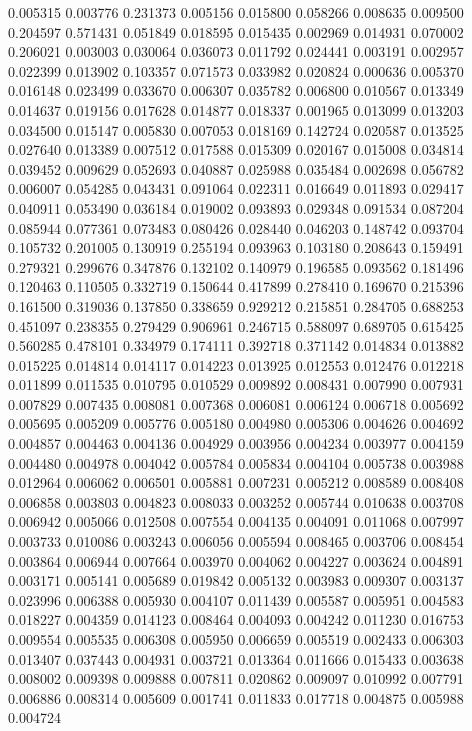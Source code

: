 0.005315
0.003776
0.231373
0.005156
0.015800
0.058266
0.008635
0.009500
0.204597
0.571431
0.051849
0.018595
0.015435
0.002969
0.014931
0.070002
0.206021
0.003003
0.030064
0.036073
0.011792
0.024441
0.003191
0.002957
0.022399
0.013902
0.103357
0.071573
0.033982
0.020824
0.000636
0.005370
0.016148
0.023499
0.033670
0.006307
0.035782
0.006800
0.010567
0.013349
0.014637
0.019156
0.017628
0.014877
0.018337
0.001965
0.013099
0.013203
0.034500
0.015147
0.005830
0.007053
0.018169
0.142724
0.020587
0.013525
0.027640
0.013389
0.007512
0.017588
0.015309
0.020167
0.015008
0.034814
0.039452
0.009629
0.052693
0.040887
0.025988
0.035484
0.002698
0.056782
0.006007
0.054285
0.043431
0.091064
0.022311
0.016649
0.011893
0.029417
0.040911
0.053490
0.036184
0.019002
0.093893
0.029348
0.091534
0.087204
0.085944
0.077361
0.073483
0.080426
0.028440
0.046203
0.148742
0.093704
0.105732
0.201005
0.130919
0.255194
0.093963
0.103180
0.208643
0.159491
0.279321
0.299676
0.347876
0.132102
0.140979
0.196585
0.093562
0.181496
0.120463
0.110505
0.332719
0.150644
0.417899
0.278410
0.169670
0.215396
0.161500
0.319036
0.137850
0.338659
0.929212
0.215851
0.284705
0.688253
0.451097
0.238355
0.279429
0.906961
0.246715
0.588097
0.689705
0.615425
0.560285
0.478101
0.334979
0.174111
0.392718
0.371142
0.014834
0.013882
0.015225
0.014814
0.014117
0.014223
0.013925
0.012553
0.012476
0.012218
0.011899
0.011535
0.010795
0.010529
0.009892
0.008431
0.007990
0.007931
0.007829
0.007435
0.008081
0.007368
0.006081
0.006124
0.006718
0.005692
0.005695
0.005209
0.005776
0.005180
0.004980
0.005306
0.004626
0.004692
0.004857
0.004463
0.004136
0.004929
0.003956
0.004234
0.003977
0.004159
0.004480
0.004978
0.004042
0.005784
0.005834
0.004104
0.005738
0.003988
0.012964
0.006062
0.006501
0.005881
0.007231
0.005212
0.008589
0.008408
0.006858
0.003803
0.004823
0.008033
0.003252
0.005744
0.010638
0.003708
0.006942
0.005066
0.012508
0.007554
0.004135
0.004091
0.011068
0.007997
0.003733
0.010086
0.003243
0.006056
0.005594
0.008465
0.003706
0.008454
0.003864
0.006944
0.007664
0.003970
0.004062
0.004227
0.003624
0.004891
0.003171
0.005141
0.005689
0.019842
0.005132
0.003983
0.009307
0.003137
0.023996
0.006388
0.005930
0.004107
0.011439
0.005587
0.005951
0.004583
0.018227
0.004359
0.014123
0.008464
0.004093
0.004242
0.011230
0.016753
0.009554
0.005535
0.006308
0.005950
0.006659
0.005519
0.002433
0.006303
0.013407
0.037443
0.004931
0.003721
0.013364
0.011666
0.015433
0.003638
0.008002
0.009398
0.009888
0.007811
0.020862
0.009097
0.010992
0.007791
0.006886
0.008314
0.005609
0.001741
0.011833
0.017718
0.004875
0.005988
0.004724

